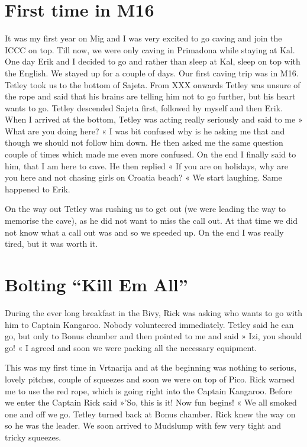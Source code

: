
\section{First time in M16}\label{first-time-in-m16}

It was my first year on Mig and I was very excited to go caving and join
the ICCC on top. Till now, we were only caving in Primadona while
staying at Kal. One day Erik and I decided to go and rather than sleep
at Kal, sleep on top with the English. We stayed up for a couple of
days. Our first caving trip was in M16. Tetley took us to the bottom of
Sajeta. From XXX onwards Tetley was unsure of the rope and said that his
brains are telling him not to go further, but his heart wants to go.
Tetley descended Sajeta first, followed by myself and then Erik. When I
arrived at the bottom, Tetley was acting really seriously and said to me
» What are you doing here? « I was bit confused why is he asking me that
and though we should not follow him down. He then asked me the same
question couple of times which made me even more confused. On the end I
finally said to him, that I am here to cave. He then replied « If you
are on holidays, why are you here and not chasing girls on Croatia
beach? « We start laughing. Same happened to Erik.

On the way out Tetley was rushing us to get out (we were leading the way
to memorise the cave), as he did not want to miss the call out. At that
time we did not know what a call out was and so we speeded up. On the
end I was really tired, but it was worth it.


\section{\texorpdfstring{Bolting ``Kill Em
All''}{Bolting Kill Em All}}\label{bolting-kill-em-all}

During the ever long breakfast in the Bivy, Rick was asking who wants to
go with him to Captain Kangaroo. Nobody volunteered immediately. Tetley
said he can go, but only to Bonus chamber and then pointed to me and
said » Izi, you should go! « I agreed and soon we were packing all the
necessary equipment.

This was my first time in Vrtnarija and at the beginning was nothing to
serious, lovely pitches, couple of squeezes and soon we were on top of
Pico. Rick warned me to use the red rope, which is going right into the
Captain Kangaroo. Before we enter the Captain Rick said »'So, this is
it! Now fun begins! « We all smoked one and off we go. Tetley turned
back at Bonus chamber. Rick knew the way on so he was the leader. We
soon arrived to Mudslump with few very tight and tricky squeezes.

